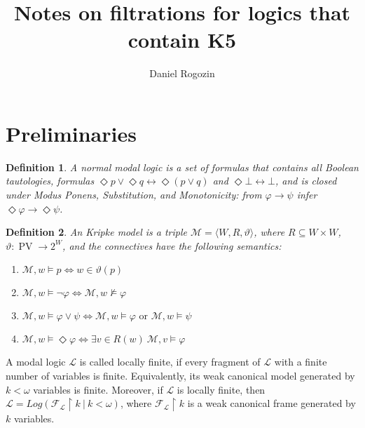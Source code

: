 \documentclass[a4paper]{article}
\author{Daniel Rogozin}
\date{}
\title{Notes on filtrations for logics that contain {\bf K5}}
\theoremstyle{defin}
\newtheorem{defin}{Definition}
\theoremstyle{theorem}
\theoremstyle{prop}
\theoremstyle{lemma}
\theoremstyle{fact}
\theoremstyle{ex}
\theoremstyle{col}
\theoremstyle{claim}
\begin{document}
\maketitle

\section{Preliminaries}

\begin{defin}
  A normal modal logic is a set of formulas that contains all Boolean tautologies,
  formulas $\Diamond p \lor \Diamond q \leftrightarrow \Diamond (p \lor q)$ and
  $\Diamond \bot \leftrightarrow \bot$, and is closed under Modus Ponens, Substitution, and
  Monotonicity:
  from $\varphi \rightarrow \psi$ infer $\Diamond \varphi \rightarrow \Diamond \psi$.
\end{defin}

\begin{defin} An Kripke model is a triple $\mathcal{M} = \langle W, R, \vartheta \rangle$,
  where $R \subseteq W \times W$, $\vartheta : \operatorname{PV} \to 2^W$, and
  the connectives have the following semantics:

  \begin{enumerate}
    \item $\mathcal{M}, w \models p \Leftrightarrow w \in \vartheta(p)$
    \item $\mathcal{M}, w \models \neg \varphi \Leftrightarrow \mathcal{M}, w \nvDash \varphi$
    \item $\mathcal{M}, w \models \varphi \lor \psi \Leftrightarrow \mathcal{M}, w \models \varphi \text{ or } \mathcal{M}, w \models \psi$
    \item $\mathcal{M}, w \models \Diamond \varphi \Leftrightarrow \exists v \in R(w) \: \mathcal{M}, v \models \varphi$
  \end{enumerate}
\end{defin}

A modal logic $\mathcal{L}$ is called locally finite, if every fragment of $\mathcal{L}$ with a finite number of variables is finite. Equivalently, its weak canonical model generated by $k < \omega$ variables is finite. Moreover, if $\mathcal{L}$ is locally finite, then $\mathcal{L} = Log(\mathcal{F}_{\mathcal{L}} \upharpoonright k \: | \: k < \omega)$, where $\mathcal{F}_{\mathcal{L}} \upharpoonright k$ is a weak canonical frame generated by $k$ variables.
\end{document}
